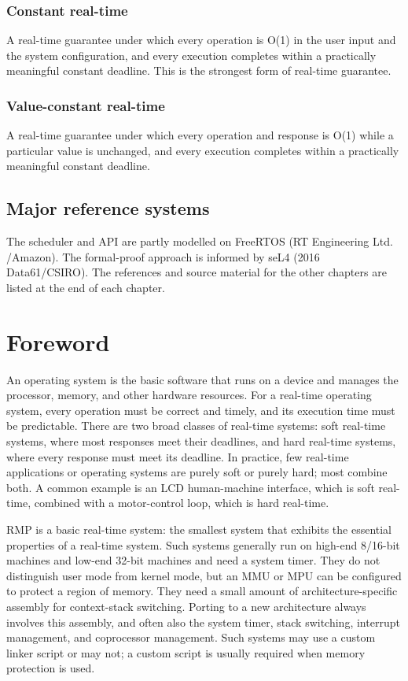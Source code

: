 \subsubsection{Constant real-time}

A real-time guarantee under which every operation is O(1) in the user input and the system configuration, and every execution completes within a practically meaningful constant deadline.
This is the strongest form of real-time guarantee.

\subsubsection{Value-constant real-time}

A real-time guarantee under which every operation and response is O(1) while a particular value is unchanged, and every execution completes within a practically meaningful constant deadline.

\subsection{Major reference systems}

The scheduler and API are partly modelled on FreeRTOS (RT Engineering Ltd.
/Amazon).
The formal-proof approach is informed by seL4 (2016 Data61/CSIRO).
The references and source material for the other chapters are listed at the end of each chapter.

\section{Foreword}

An operating system is the basic software that runs on a device and manages the processor, memory, and other hardware resources.
For a real-time operating system, every operation must be correct and timely, and its execution time must be predictable.
There are two broad classes of real-time systems: soft real-time systems, where most responses meet their deadlines, and hard real-time systems, where every response must meet its deadline.
In practice, few real-time applications or operating systems are purely soft or purely hard; most combine both.
A common example is an LCD human-machine interface, which is soft real-time, combined with a motor-control loop, which is hard real-time.

RMP is a basic real-time system: the smallest system that exhibits the essential properties of a real-time system.
Such systems generally run on high-end 8/16-bit machines and low-end 32-bit machines and need a system timer.
They do not distinguish user mode from kernel mode, but an MMU or MPU can be configured to protect a region of memory.
They need a small amount of architecture-specific assembly for context-stack switching.
Porting to a new architecture always involves this assembly, and often also the system timer, stack switching, interrupt management, and coprocessor management.
Such systems may use a custom linker script or may not; a custom script is usually required when memory protection is used.

